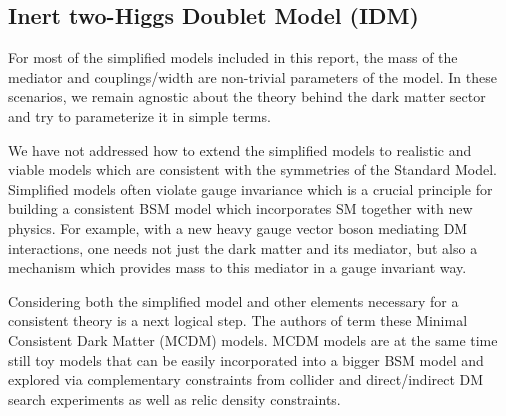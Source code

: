 \subsection{Inert two-Higgs Doublet Model (IDM)}\label{sec:i2HDM}

For most of the simplified models included in this report, the mass of
the mediator and couplings/width are non-trivial parameters of the
model. In these scenarios, we remain agnostic about the theory behind
the dark matter sector and try to parameterize it in simple terms.

We have not addressed how to extend the simplified models to realistic
and viable models which are consistent with the symmetries of the
Standard Model. Simplified models often violate gauge invariance which
is a crucial principle for building a consistent BSM model which
incorporates SM together with new physics. For example, with a new
heavy gauge vector boson mediating DM interactions, one needs not just
the dark matter and its mediator, but also a mechanism which provides
mass to this mediator in a gauge invariant way.

Considering both the simplified model and other elements necessary for a consistent theory is a next logical step. The authors of \cite{Belyaev:2015tap} term these Minimal
Consistent Dark Matter (MCDM) models. MCDM models are at the same time still toy models that can be 
easily incorporated into a bigger BSM model and explored via
complementary constraints from collider and direct/indirect DM search
experiments as well as relic density constraints. 




